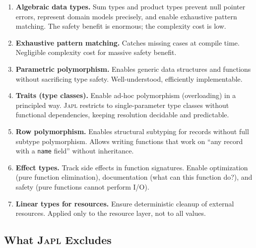 \documentclass[11pt,twocolumn]{article}
\newcommand{\japl}{\textsc{Japl}}
\begin{document}
\begin{enumerate}[leftmargin=*]
\item \textbf{Algebraic data types.} Sum types and product types prevent null pointer errors, represent domain models precisely, and enable exhaustive pattern matching. The safety benefit is enormous; the complexity cost is low.

\item \textbf{Exhaustive pattern matching.} Catches missing cases at compile time. Negligible complexity cost for massive safety benefit.

\item \textbf{Parametric polymorphism.} Enables generic data structures and functions without sacrificing type safety. Well-understood, efficiently implementable.

\item \textbf{Traits (type classes).} Enable ad-hoc polymorphism (overloading) in a principled way. \japl{} restricts to single-parameter type classes without functional dependencies, keeping resolution decidable and predictable.

\item \textbf{Row polymorphism.} Enables structural subtyping for records without full subtype polymorphism. Allows writing functions that work on ``any record with a \texttt{name} field'' without inheritance.

\item \textbf{Effect types.} Track side effects in function signatures. Enable optimization (pure function elimination), documentation (what can this function do?), and safety (pure functions cannot perform I/O).

\item \textbf{Linear types for resources.} Ensure deterministic cleanup of external resources. Applied only to the resource layer, not to all values.
\end{enumerate}

\subsection{What \japl{} Excludes}
\end{document}
